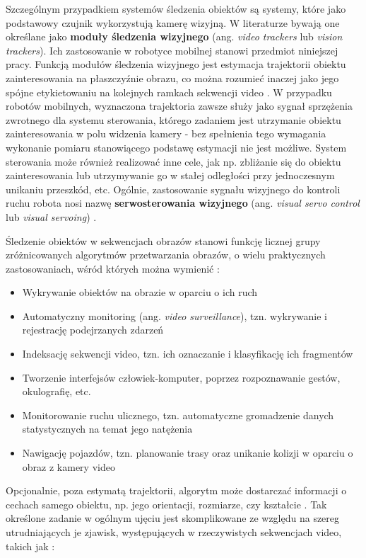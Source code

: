 Szczególnym przypadkiem systemów śledzenia obiektów są systemy, które jako podstawowy czujnik wykorzystują kamerę wizyjną. W literaturze bywają one określane jako \textbf{moduły śledzenia wizyjnego} (ang. \textit{video trackers} lub \textit{vision trackers}). Ich zastosowanie w robotyce mobilnej stanowi przedmiot niniejszej pracy. Funkcją modułów śledzenia wizyjnego jest estymacja trajektorii obiektu zainteresowania na płaszczyźnie obrazu, co można rozumieć inaczej jako jego spójne etykietowaniu na kolejnych ramkach sekwencji video \cite{Yilmaz2006}. W przypadku robotów mobilnych, wyznaczona trajektoria zawsze służy jako sygnał sprzężenia zwrotnego dla systemu sterowania, którego zadaniem jest utrzymanie obiektu zainteresowania w polu widzenia kamery - bez spełnienia tego wymagania wykonanie pomiaru stanowiącego podstawę estymacji nie jest możliwe. System sterowania może również realizować inne cele, jak np. zbliżanie się do obiektu zainteresowania lub utrzymywanie go w stałej odległości przy jednoczesnym unikaniu przeszkód, etc. Ogólnie, zastosowanie sygnału wizyjnego do kontroli ruchu robota nosi nazwę \textbf{serwosterowania wizyjnego} (ang. \textit{visual servo control} lub \textit{visual servoing}) \cite{Chaumette2006}. 

Śledzenie obiektów w sekwencjach obrazów stanowi funkcję licznej grupy zróżnicowanych algorytmów przetwarzania obrazów, o wielu praktycznych zastosowaniach, wśród których można wymienić \cite{Yilmaz2006}:

\begin{itemize}

	\item Wykrywanie obiektów na obrazie w oparciu o ich ruch
	\item Automatyczny monitoring (ang. \textit{video surveillance}), tzn. wykrywanie i rejestrację podejrzanych zdarzeń
	\item Indeksację sekwencji video, tzn. ich oznaczanie i klasyfikację ich fragmentów
	\item Tworzenie interfejsów człowiek-komputer, poprzez rozpoznawanie gestów, okulografię, etc.
	\item Monitorowanie ruchu ulicznego, tzn. automatyczne gromadzenie danych statystycznych na temat jego natężenia
	\item Nawigację pojazdów, tzn. planowanie trasy oraz unikanie kolizji w oparciu o obraz z kamery video

\end{itemize}	
	
Opcjonalnie, poza estymatą trajektorii, algorytm może dostarczać informacji o cechach samego obiektu, np. jego orientacji, rozmiarze, czy kształcie \cite{Yilmaz2006}. Tak określone zadanie w ogólnym ujęciu jest skomplikowane ze względu na szereg utrudniających je zjawisk, występujących w rzeczywistych sekwencjach video, takich jak \cite{Yilmaz2006}:

